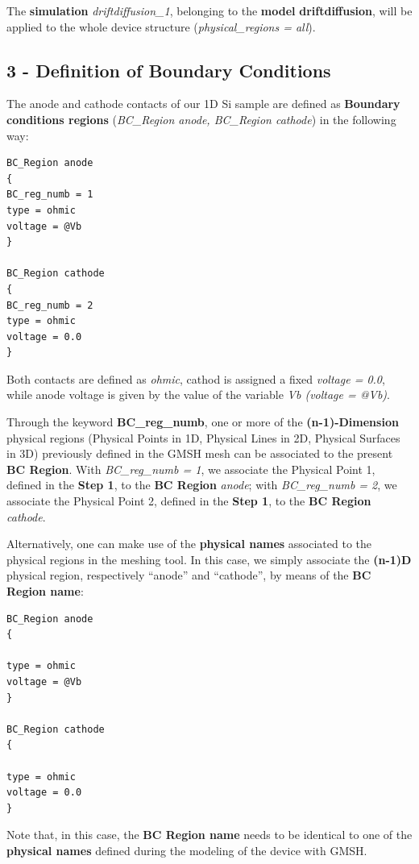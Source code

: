 The \TiberCAD{} \textbf{simulation} \textit{driftdiffusion\_1}, belonging to the  \textbf{model} \textbf{driftdiffusion}, will be applied to the whole device structure (\textit{physical\_regions = all}).


\subsection* {3 - Definition of Boundary Conditions}
The anode and cathode contacts of our 1D Si sample are defined as \textbf{Boundary conditions regions} (\textit{BC\_Region anode, BC\_Region cathode}) in the following way:

\begin{verbatim}
BC_Region anode
{
BC_reg_numb = 1
type = ohmic
voltage = @Vb
}

BC_Region cathode
{
BC_reg_numb = 2
type = ohmic
voltage = 0.0
}
\end{verbatim}
Both contacts are defined as \textit{ohmic}, cathod is assigned a fixed \textit{voltage = 0.0}, while anode voltage is given by the value of the variable \textit{Vb (voltage = @Vb)}.

Through the keyword  \textbf{BC\_reg\_numb}, one or more of the \textbf{(n-1)-Dimension} physical regions (Physical Points in 1D, Physical Lines in 2D, Physical Surfaces in 3D) previously defined in the GMSH mesh can be associated to the present  \TiberCAD{} \textbf{BC Region}.
With \textit{BC\_reg\_numb = 1}, we associate the Physical Point 1, defined in the \textbf{Step 1}, to the \TiberCAD{} \textbf{BC Region} \textit{anode}; with \textit{BC\_reg\_numb = 2}, we associate the Physical Point 2, defined in the \textbf{Step 1}, to the \TiberCAD{} \textbf{BC Region} \textit{cathode}.

Alternatively, one can make  use  of  the  \textbf{physical names} associated to the physical regions in the  meshing  tool.
In  this  case, we  simply associate the  \textbf{(n-1)D} physical region,  respectively  ``anode'' and  ``cathode'',  by  means  of  the  \TiberCAD{} \textbf{BC Region name}:

 \begin{verbatim}
BC_Region anode
{

type = ohmic
voltage = @Vb
}

BC_Region cathode
{

type = ohmic
voltage = 0.0
}
\end{verbatim}

Note that, in  this  case, the \TiberCAD{} \textbf{BC Region name} needs to  be  identical to  one of the  \textbf{physical names} defined during the  modeling of the  device  with   GMSH.



